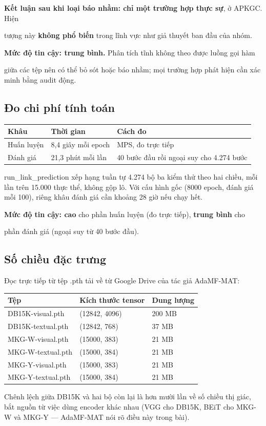 \documentclass[11pt,a4paper]{article}
\newcommand{\code}[1]{{\ttfamily\small\color{codetext}#1}}
\begin{document}
\textbf{Kết luận sau khi loại báo nhầm: chỉ một trường hợp thực sự}, ở APKGC. Hiện

tượng này \textbf{không phổ biến} trong lĩnh vực như giả thuyết ban đầu của nhóm.

\textbf{Mức độ tin cậy: trung bình.} Phân tích tĩnh không theo được luồng gọi hàm

giữa các tệp nên có thể bỏ sót hoặc báo nhầm; mọi trường hợp phát hiện cần xác minh bằng audit động.

\subsection{Đo chi phí tính toán}
\begin{center}\small
\begin{tabular}{@{}lll@{}}
\toprule
\textbf{Khâu} & \textbf{Thời gian} & \textbf{Cách đo}\\
\midrule
Huấn luyện & 8,4 giây mỗi epoch & MPS, đo trực tiếp\\
Đánh giá & 21,3 phút mỗi lần & 40 bước đầu rồi ngoại suy cho 4.274 bước\\
\bottomrule
\end{tabular}
\end{center}
\code{run\_link\_prediction} xếp hạng tuần tự 4.274 bộ ba kiểm thử theo hai chiều, mỗi lần trên 15.000 thực thể, không gộp lô. Với cấu hình gốc (8000 epoch, đánh giá mỗi 100), riêng khâu đánh giá cần khoảng 28 giờ nếu chạy hết.

\textbf{Mức độ tin cậy: cao} cho phần huấn luyện (đo trực tiếp), \textbf{trung bình} cho

phần đánh giá (ngoại suy từ 40 bước đầu).

\subsection{Số chiều đặc trưng}
Đọc trực tiếp từ tệp \code{.pth} tải về từ Google Drive của tác giả AdaMF-MAT:

\begin{center}\small
\begin{tabular}{@{}lll@{}}
\toprule
\textbf{Tệp} & \textbf{Kích thước tensor} & \textbf{Dung lượng}\\
\midrule
DB15K-visual.pth & (12842, 4096) & 200 MB\\
DB15K-textual.pth & (12842, 768) & 37 MB\\
MKG-W-visual.pth & (15000, 383) & 21 MB\\
MKG-W-textual.pth & (15000, 384) & 21 MB\\
MKG-Y-visual.pth & (15000, 383) & 21 MB\\
MKG-Y-textual.pth & (15000, 384) & 21 MB\\
\bottomrule
\end{tabular}
\end{center}
Chênh lệch giữa DB15K và hai bộ còn lại là hơn mười lần về số chiều thị giác, bắt nguồn từ việc dùng encoder khác nhau (VGG cho DB15K, BEiT cho MKG-W và MKG-Y --- AdaMF-MAT nói rõ điều này trong bài).
\end{document}

